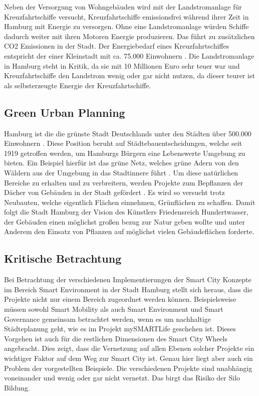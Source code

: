 Neben der Versorgung von Wohngebäuden wird mit der Landstromanlage für Kreuzfahrtschiffe versucht, Kreuzfahrtschiffe emissionsfrei während ihrer Zeit in Hamburg mit Energie zu versorgen.
Ohne eine Landstromanlage würden Schiffe dadurch weiter mit ihren Motoren Energie produzieren.
Das führt zu zusätzlichen CO2 Emissionen in der Stadt.
Der Energiebedarf eines Kreuzfahrtschiffes entspricht der einer Kleinstadt mit ca. 75.000 Einwohnern \autocite[vgl.][]{SmartCityKompass.OD}.
Die Landstromanlage in Hamburg steht in Kritik, da sie mit 10 Millionen Euro sehr teuer war und Kreuzfahrtschiffe den Landstrom wenig oder gar nicht nutzen, da dieser teurer ist als selbsterzeugte Energie der Kreuzfahrtschiffe.

\subsection{Green Urban Planning}
Hamburg ist die die grünste Stadt Deutschlands unter den Städten über 500.000 Einwohnern \autocite[vgl.][]{BerlinerMorgenpost.2016}.
Diese Position beruht auf Städtebauentscheidungen, welche seit 1919 getroffen werden, um Hamburgs Bürgern eine Lebenswerte Umgebung zu bieten. Ein Beispiel hierfür ist das grüne Netz, welches grüne Adern von den Wäldern aus der Umgebung in das Stadtinnere führt \autocite[vgl.][]{Hamburg.ODC}.
Um diese natürlichen Bereiche zu erhalten und zu verbreitern, werden Projekte zum Bepflanzen der Dächer von Gebäuden in der Stadt gefördert \autocite[vgl.][]{Hamburg.ODD}.
Es wird so versucht trotz Neubauten, welche eigentlich Flächen einnehmen, Grünflächen zu schaffen.
Damit folgt die Stadt Hamburg der Vision des Künstlers Friedensreich Hundertwasser, der Gebäuden einen möglichst großen bezug zur Natur geben wollte und unter Anderem den Einsatz von Pflanzen auf möglichst vielen Gebäudeflächen forderte.

\subsection{Kritische Betrachtung}
Bei Betrachtung der verschiedenen Implementierungen der Smart City Konzepte im Bereich Smart Environment in der Stadt Hamburg stellt sich heraus, dass die Projekte nicht nur einem Bereich zugeordnet werden können.
Beispielsweise müssen sowohl Smart Mobility als auch Smart Environment und Smart Governance gemeinsam betrachtet werden, wenn es um nachhaltige Städteplanung geht, wie es im Projekt mySMARTLife geschehen ist.
Dieses Vorgehen ist auch für die restlichen Dimensionen des Smart City Wheels angebracht.
Dies zeigt, dass die Vernetzung auf allen Ebenen solcher Projekte ein wichtiger Faktor auf dem Weg zur Smart City ist.
Genau hier liegt aber auch ein Problem der vorgestellten Beispiele.
Die verschiedenen Projekte sind unabhängig voneinander und wenig oder gar nicht vernetzt.
Das birgt das Risiko der Silo Bildung. 